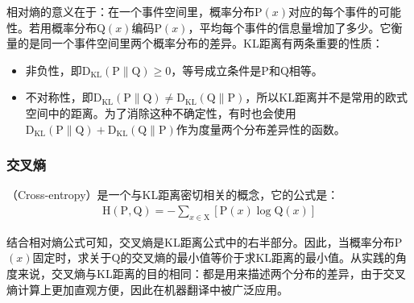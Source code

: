 \parinterval 相对熵的意义在于：在一个事件空间里，概率分布$\textrm{P}(x)$对应的每个事件的可能性。若用概率分布Q$(x)$编码$\textrm{P}(x)$，平均每个事件的信息量增加了多少。它衡量的是同一个事件空间里两个概率分布的差异。KL距离有两条重要的性质：

\begin{itemize}
\vspace{0.5em}
\item 非负性，即$\textrm{D}_{\textrm{KL}} (\textrm{P} \parallel \textrm{Q}) \ge 0$，等号成立条件是$\textrm{P}$和$\textrm{Q}$相等。
\vspace{0.5em}
\item 不对称性，即$\textrm{D}_{\textrm{KL}} (\textrm{P} \parallel \textrm{Q}) \neq \textrm{D}_{\textrm{KL}} (\textrm{Q}  \parallel \textrm{P})$，所以$\textrm{KL}$距离并不是常用的欧式空间中的距离。为了消除这种不确定性，有时也会使用$\textrm{D}_{\textrm{KL}} (\textrm{P}  \parallel \textrm{Q})+\textrm{D}_{\textrm{KL}} (\textrm{Q}  \parallel \textrm{P})$作为度量两个分布差异性的函数。
\vspace{0.5em}
\end{itemize}


\subsubsection{交叉熵}

（Cross-entropy）是一个与KL距离密切相关的概念，它的公式是：
\begin{eqnarray}
\textrm{H}(\textrm{P},\textrm{Q})=-\sum_{x \in \textrm{X}} [\textrm{P}(x) \log \textrm{Q}(x) ]
\label{eq:2-16}
\end{eqnarray}

\parinterval 结合相对熵公式可知，交叉熵是KL距离公式中的右半部分。因此，当概率分布P$(x)$固定时，求关于Q的交叉熵的最小值等价于求KL距离的最小值。从实践的角度来说，交叉熵与KL距离的目的相同：都是用来描述两个分布的差异，由于交叉熵计算上更加直观方便，因此在机器翻译中被广泛应用。


